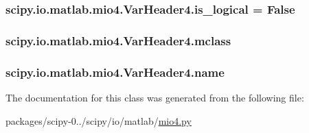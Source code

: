 \subsubsection[{is\+\_\+logical}]{\setlength{\rightskip}{0pt plus 5cm}scipy.\+io.\+matlab.\+mio4.\+Var\+Header4.\+is\+\_\+logical = {\bf False}\hspace{0.3cm}{\ttfamily [static]}}\label{classscipy_1_1io_1_1matlab_1_1mio4_1_1VarHeader4_a80c419c9674323a5d61db8525ac6eba4}
\hypertarget{classscipy_1_1io_1_1matlab_1_1mio4_1_1VarHeader4_a91b52d1031518509055045ec9ecc1460}{}
\subsubsection[{mclass}]{\setlength{\rightskip}{0pt plus 5cm}scipy.\+io.\+matlab.\+mio4.\+Var\+Header4.\+mclass}\label{classscipy_1_1io_1_1matlab_1_1mio4_1_1VarHeader4_a91b52d1031518509055045ec9ecc1460}
\hypertarget{classscipy_1_1io_1_1matlab_1_1mio4_1_1VarHeader4_afdfcafbfc626c9d59870fef901e6336e}{}
\subsubsection[{name}]{\setlength{\rightskip}{0pt plus 5cm}scipy.\+io.\+matlab.\+mio4.\+Var\+Header4.\+name}\label{classscipy_1_1io_1_1matlab_1_1mio4_1_1VarHeader4_afdfcafbfc626c9d59870fef901e6336e}


The documentation for this class was generated from the following file\+:\begin{DoxyCompactItemize}
\item 
packages/scipy-\/0../scipy/io/matlab/\hyperlink{mio4_8py}{mio4.\+py}\end{DoxyCompactItemize}
